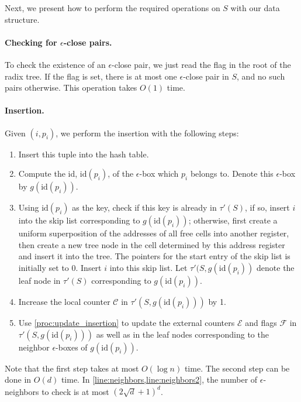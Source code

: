 \documentclass[10pt,a4paper]{article}
\newcommand{\id}{\mathrm{id}}
\begin{document}
Next, we present how to perform the required operations on $S$ with our data structure.

\paragraph{Checking for $\epsilon$-close pairs.}To check the existence of an $\epsilon$-close pair, we just read the flag in the root of the radix tree. If the flag is set, there is at most one $\epsilon$-close pair in $S$, and no such pairs otherwise. This operation takes $O(1)$ time.

\paragraph{Insertion.} 
Given $(i, p_i)$, we perform the insertion with the following steps:
\begin{enumerate}
  \item Insert this tuple into the hash table.
  \item Compute the id, $\id(p_i)$, of the $\epsilon$-box which $p_i$ belongs to. Denote this $\epsilon$-box by $g(\id(p_i))$.
  \item Using $\id(p_i)$ as the key, check if this key is already in $\tau'(S)$, if so, insert $i$ into the skip list corresponding to $g(\id(p_i))$; otherwise, first create a uniform superposition of the addresses of all free cells into another register, then create a new tree node in the cell determined by this address register and insert it into the tree. The pointers for the start entry of the skip list is initially set to 0. Insert $i$ into this skip list. Let $\tau'(S, g(\id(p_i))$ denote the leaf node in $\tau'(S)$ corresponding to $g(\id(p_i))$.
  \item Increase the local counter $\mathcal{C}$ in $\tau'(S, g(\id(p_i)))$ by 1.
  \item Use \cref{proc:update_insertion} to update the external counters $\mathcal{E}$ and flags $\mathcal{F}$ in $\tau'(S, g(\id(p_i)))$ as well as in the leaf nodes corresponding to the neighbor $\epsilon$-boxes of $g(\id(p_i))$.
\end{enumerate}

Note that the first step takes at most $O(\log n)$ time. The second step can be done in $O(d)$ time. In \cref{line:neighbors,line:neighbors2}, the number of $\epsilon$-neighbors to check is at most $(2\sqrt{d}+1)^d$.
\end{document}
